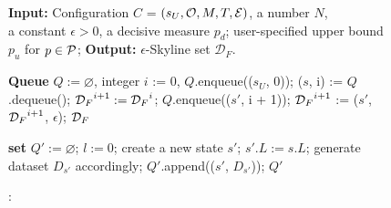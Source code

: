 \begin{figure}
\centering
\begin{algorithm}[H]
\caption{:\apxmodis}
\label{alg:forward}
\begin{algorithmic}[1]

\State \textbf{Input:} 
    Configuration $C$ = $(s_U, \O, M, T, \E)$, 
    a number $N$, \\ a constant $\epsilon>0$, 
    a decisive measure $p_d$;
    user-specified upper bound $p_u$ for $p \in \P$;
\State \textbf{Output:} 
     $\epsilon$-Skyline set $\mathcal{D}_F$.

     \vspace{1ex}
    \State \textbf{Queue} $Q := \varnothing$, integer $i$ := 0, $Q$.enqueue(($s_U$, 0));\label{apx:initialize}  
     \label{apx:main:s} %
        \State ($s$, i) := $Q$.dequeue();
        ${\D_F}^{i+1} := {\D_F}^i$; 
            \State $Q$.enqueue(($s'$, i + 1));
            \State ${\D_F}^{i + 1}$ := \upi($s'$, %
            ${\D_F}^{i + 1}$, $\epsilon$);
        \EndFor
    \EndWhile \label{apx:main:e}
 \State \Return ${\D_F}$ \label{apx:return}

\vspace{1ex}
    \State \textbf{set} $Q':=\varnothing$; \label{apx:opg:s}
            \State $l := 0$;  
            \State create a new state $s'$; 
            $s'.L := s.L$; 
            \State generate dataset $D_{s'}$ accordingly; 
            \State $Q'$.append(($s'$, $D_{s'}$)); 
        \EndIf
    \EndFor
    \State \Return $Q'$
\EndProcedure \label{apx:opg:e}



\end{algorithmic}
\end{algorithm}
\end{figure}
